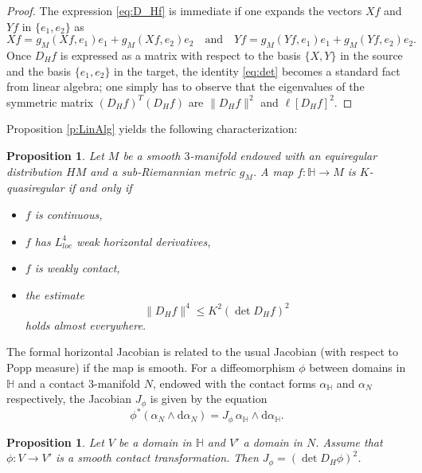 \documentclass[10pt,letterpaper]{amsart}
\newtheorem{prop}[thm]{Proposition}
\theoremstyle{definition}
\numberwithin{thm}{subsection}
\numberwithin{equation}{section}
\begin{document}
\begin{proof}
The expression \eqref{eq:D_Hf} is immediate if one expands the
vectors $Xf$ and $Yf$ in $\{e_1,e_2\}$ as
\begin{displaymath}
 Xf = g_M(Xf,e_1) e_1 + g_M(Xf,e_2) e_2\quad\text{and}\quad Yf = g_M(Yf,e_1) e_1 + g_M(Yf,e_2) e_2.
\end{displaymath}
Once $D_H f$ is expressed as a matrix with respect to the basis
$\{X,Y\}$ in the source and the basis $\{e_1,e_2\}$ in the target,
the identity \eqref{eq:det} becomes a standard fact from linear
algebra; one simply has to observe that the eigenvalues of the
symmetric matrix $(D_H f)^T (D_H f)$ are $\|D_H f\|^2$ and
$\ell[D_H f]^2$.
\end{proof}

Proposition \ref{p:LinAlg} yields the following characterization:

\begin{prop}\label{p:qr_formal_jac}
Let $M$ be a smooth $3$-manifold endowed with an equiregular distribution $HM$ and a sub-Riemannian metric $g_M$. A map $f:{\mathbb H} \to M$ is $K$-quasiregular if and only if
\begin{itemize}
\item $f$ is continuous,
\item $f$ has {$L^4_{loc}$ weak horizontal derivatives},
\item $f$ is weakly contact,
\item  the estimate
\begin{equation}\label{eq:dist}
\|D_H f\|^4 \leq K^2 (\det D_H f)^2
\end{equation}
holds almost everywhere.
\end{itemize}
\end{prop}

The formal horizontal Jacobian is related to the usual Jacobian (with respect to Popp measure) if the map is smooth. For a diffeomorphism $\phi$ between domains in ${\mathbb H}$ and a contact $3$-manifold $N$, endowed with the contact forms $\alpha_{\mathbb H}$ and $\alpha_N$ respectively, the Jacobian $J_{\phi}$ is given by the equation
\begin{displaymath}
\phi^{\ast} (\alpha_N\wedge \mathrm{d}\alpha_N) = J_{\phi} \,
\alpha_{\mathbb H} \wedge \mathrm{d}\alpha_{\mathbb H}.
\end{displaymath}

\begin{prop}\label{p:Jac2}
Let $V$ be a domain in ${\mathbb H}$ and $V'$ a domain in $N$. Assume that $\phi: V \to V'$ is a smooth contact transformation. Then $J_{\phi} =(\det D_H \phi)^2$. 
\end{prop}
\end{document}
